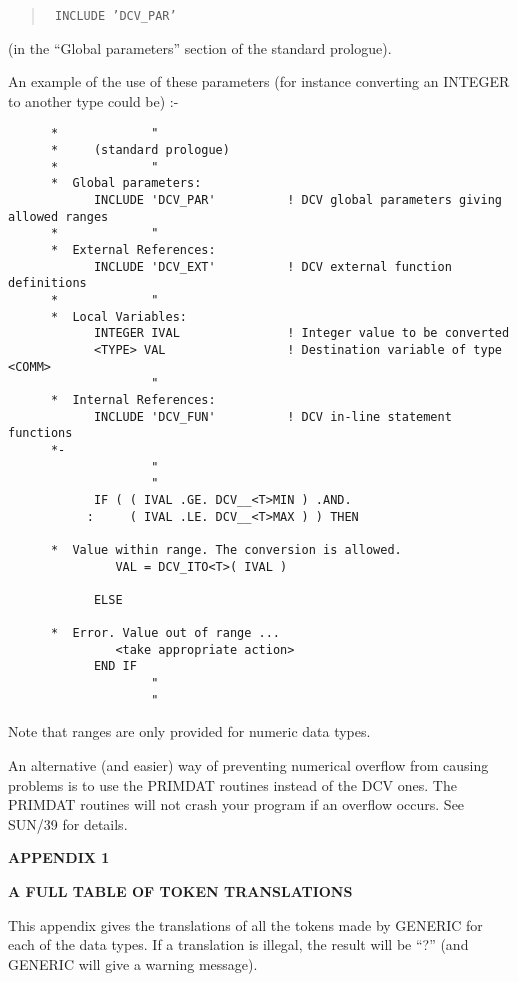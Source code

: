 \begin{quote}{\tt
INCLUDE 'DCV\_PAR'
}
\end{quote}

(in the ``Global parameters'' section of the standard prologue).

An example of the use of these parameters (for instance
converting an INTEGER to another type could be) :-

\begin{verbatim}
      *             "
      *     (standard prologue)
      *             "
      *  Global parameters:
            INCLUDE 'DCV_PAR'          ! DCV global parameters giving allowed ranges
      *             "
      *  External References:
            INCLUDE 'DCV_EXT'          ! DCV external function definitions
      *             "
      *  Local Variables:
            INTEGER IVAL               ! Integer value to be converted
            <TYPE> VAL                 ! Destination variable of type <COMM>
                    "
      *  Internal References:
            INCLUDE 'DCV_FUN'          ! DCV in-line statement functions
      *-
                    "
                    "
            IF ( ( IVAL .GE. DCV__<T>MIN ) .AND.
           :     ( IVAL .LE. DCV__<T>MAX ) ) THEN

      *  Value within range. The conversion is allowed.
               VAL = DCV_ITO<T>( IVAL )

            ELSE
      
      *  Error. Value out of range ...
               <take appropriate action>
            END IF
                    "
                    "
\end{verbatim}
      
Note that ranges are only provided for numeric data types.

An alternative (and easier) way of preventing numerical overflow from causing
problems is to use the PRIMDAT routines instead of the DCV ones. The PRIMDAT
routines will not crash your program if an overflow occurs. See SUN/39 for
details.

\newpage
\begin{center}
{\Large\bf APPENDIX 1}

{\large\bf A FULL TABLE OF TOKEN TRANSLATIONS}
\end{center}

This appendix gives the translations of all the tokens
made by GENERIC for each of the data types.
If a translation is illegal, the result will be ``?''
(and GENERIC will give a warning message).

